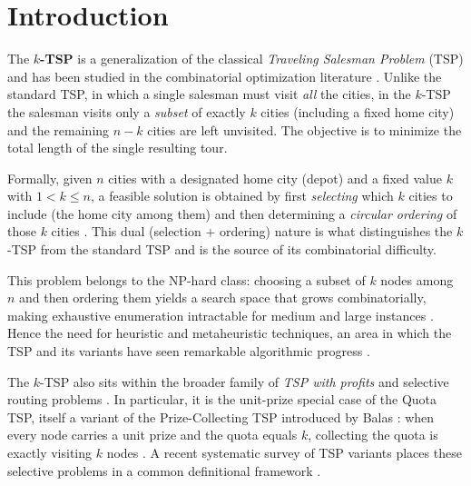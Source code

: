\documentclass[conference]{IEEEtran}
\begin{document}
\section{Introduction}

The \textbf{$k$-TSP} is a generalization of the classical \textit{Traveling Salesman Problem} (TSP) and has been studied in the combinatorial optimization literature \cite{venkatesh2018,pandiri2020,ene2017,blanchard2023}. Unlike the standard TSP, in which a single salesman must visit \emph{all} the cities, in the $k$-TSP the salesman visits only a \emph{subset} of exactly $k$ cities (including a fixed home city) and the remaining $n-k$ cities are left unvisited. The objective is to minimize the total length of the single resulting tour.

\vspace{2pt}
Formally, given $n$ cities with a designated home city (depot) and a fixed value $k$ with $1 < k \le n$, a feasible solution is obtained by first \emph{selecting} which $k$ cities to include (the home city among them) and then determining a \emph{circular ordering} of those $k$ cities \cite{venkatesh2018}. This dual (selection $+$ ordering) nature is what distinguishes the $k$-TSP from the standard TSP and is the source of its combinatorial difficulty.

\vspace{2pt}
This problem belongs to the NP-hard class: choosing a subset of $k$ nodes among $n$ and then ordering them yields a search space that grows combinatorially, making exhaustive enumeration intractable for medium and large instances \cite{lawler1985}. Hence the need for heuristic and metaheuristic techniques, an area in which the TSP and its variants have seen remarkable algorithmic progress \cite{rego2011tsp}.

\vspace{2pt}
The $k$-TSP also sits within the broader family of \emph{TSP with profits} and selective routing problems \cite{feillet2005profits}. In particular, it is the unit-prize special case of the Quota TSP, itself a variant of the Prize-Collecting TSP introduced by Balas \cite{balas1989pctsp}: when every node carries a unit prize and the quota equals $k$, collecting the quota is exactly visiting $k$ nodes \cite{bienstock1993pctsp}. A recent systematic survey of TSP variants places these selective problems in a common definitional framework \cite{tspt3co2025}.
\end{document}
